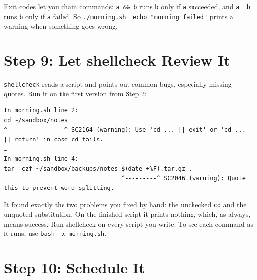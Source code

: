 Exit codes let you chain commands: \texttt{a\ \&\&\ b} runs \texttt{b} only if \texttt{a} succeeded, and \texttt{a\ \textbar{}\textbar{}\ b} runs \texttt{b} only if \texttt{a} failed. So \texttt{.}\allowbreak{}\texttt{/}\allowbreak{}\texttt{morning.}\allowbreak{}\texttt{sh\ \textbar{}\textbar{}\ echo\ "morning\ failed"} prints a warning when something goes wrong.


\section{Step 9: Let shellcheck Review It}\label{09-lab-automate-a-daily-chore:step-9-let-shellcheck-review-it}

\texttt{shellcheck} reads a script and points out common bugs, especially missing quotes. Run it on the first version from Step 2:

\begin{codeblock}

\begin{Shaded}
\begin{Highlighting}[]
\end{Highlighting}
\end{Shaded}

\end{codeblock}

\begin{codeblock}
\begin{Verbatim}[formatcom=\outputstyle]
In morning.sh line 2:
cd ~/sandbox/notes
^----------------^ SC2164 (warning): Use 'cd ... || exit' or 'cd ... || return' in case cd fails.
…
In morning.sh line 4:
tar -czf ~/sandbox/backups/notes-$(date +%F).tar.gz .
                                 ^---------^ SC2046 (warning): Quote this to prevent word splitting.
\end{Verbatim}
\end{codeblock}

It found exactly the two problems you fixed by hand: the unchecked \texttt{cd} and the unquoted substitution. On the finished script it prints nothing, which, as always, means success. Run shellcheck on every script you write. To see each command as it runs, use \texttt{bash\ -x\ morning.sh}.


\section{Step 10: Schedule It}\label{09-lab-automate-a-daily-chore:step-10-schedule-it}

